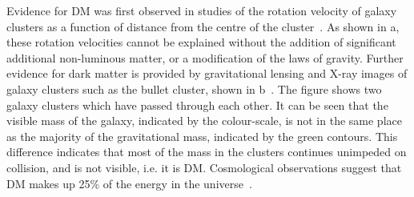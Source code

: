 Evidence for \ac{DM} was first observed in studies of the rotation velocity of galaxy clusters as a function of distance from the centre of the cluster~\cite{Zwicky:1933gu}. As shown in a, these rotation velocities cannot be explained without the addition of significant additional non-luminous matter, or a modification of the laws of gravity. Further evidence for dark matter is provided by gravitational lensing and X-ray images of galaxy clusters such as the bullet cluster, shown in b~\cite{1538-4357-648-2-L109}. The figure shows two galaxy clusters which have passed through each other. It can be seen that the visible mass of the galaxy, indicated by the colour-scale, is not in the same place as the majority of the gravitational mass, indicated by the green contours. This difference indicates that most of the mass in the clusters continues unimpeded on collision, and is not visible, i.e. it is \ac{DM}. Cosmological observations suggest that \ac{DM} makes up 25\% of the energy in the universe~\cite{refId0}.

